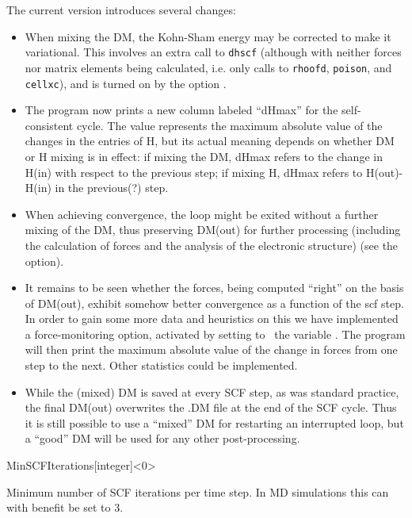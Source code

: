 The current version introduces several changes:

\begin{itemize}
\item When mixing the DM, the Kohn-Sham energy may be corrected to make it
  variational. This involves an extra call to \texttt{dhscf} (although
  with neither forces nor matrix elements being calculated, i.e. only
  calls to \texttt{rhoofd}, \texttt{poison}, and \texttt{cellxc}), and is
  turned on by the option .


\item The program now prints a new column labeled ``dHmax'' for the
  self-consistent cycle. The value represents the maximum absolute
  value of the changes in the entries of H, but its actual meaning
  depends on whether DM or H mixing is in effect: if mixing the DM,
  dHmax refers to the change in H(in) with respect to the previous
  step; if mixing H, dHmax refers to H(out)-H(in) in the previous(?)
  step.

  \item When achieving convergence, the loop might be exited without a
  further mixing of the DM, thus preserving DM(out) for further
  processing (including the calculation of forces and the analysis of
  the electronic structure) (see the 
  option).


  \item It remains to be seen whether the forces, being computed
  ``right'' on the basis of DM(out), exhibit somehow better
  convergence as a function of the scf step. In order to gain some
  more data and heuristics on this we have implemented a
  force-monitoring option, activated by setting to \fdftrue\ the
  variable . The program will then print the
  maximum absolute value of the change in forces from one step to the
  next. Other statistics could be implemented.

  \item While the (mixed) DM is saved at every SCF step, as was
  standard practice, the final DM(out) overwrites the .DM file at the
  end of the SCF cycle. Thus it is still possible to use a ``mixed''
  DM for restarting an interrupted loop, but a ``good'' DM will be
  used for any other post-processing.


\end{itemize}


\begin{fdfentry}{MinSCFIterations}[integer]<0>

  Minimum number of SCF iterations per time step. In MD
  simulations this can with benefit be set to 3.
  
\end{fdfentry}


